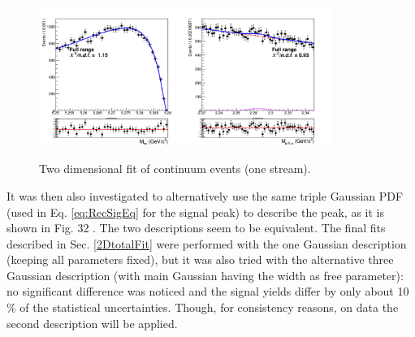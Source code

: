  

\begin{figure}[h!]
{\includegraphics[width=0.85\textwidth]{04-chargedCorrBtoLambda/figs/stream3corrLambddaC_total_continuum_2DFit.png}}
\caption{Two dimensional fit of  continuum events (one stream).}
\label{fig:stream3corrLambddaC_total_continuum_2DFit}
\end{figure}


It was then also investigated to alternatively use the same triple Gaussian PDF (used in Eq. \ref{eq:RecSigEq} for the signal peak) to describe the peak, as it is shown in Fig. 32 . The two descriptions seem to be equivalent. The final fits described in Sec. \ref{2DtotalFit} were performed with the one Gaussian description (keeping all parameters fixed), but it was also tried with the alternative three Gaussian description (with main Gaussian having the  width as free parameter): no significant difference was noticed and the signal yields differ by only about 10$\%$ of the statistical uncertainties. Though, for consistency reasons, on data the second description will be applied. 


